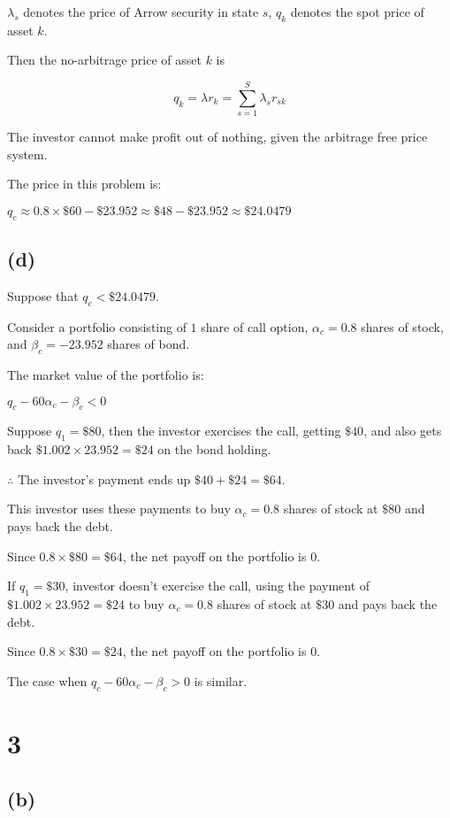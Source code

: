 \documentclass{article}
\begin{document}
$\lambda_{s}$ denotes the price of Arrow security in state $s$, $q_{k}$ denotes the spot price of asset $k$.

Then the no-arbitrage price of asset $k$ is 

\begin{equation*}
    q_{k}=\lambda r_{k}=\sum^{S}_{s=1}\lambda_{s}r_{sk}
\end{equation*}

The investor cannot make profit out of nothing, given the arbitrage free price system.

The price in this problem is:

$q_{c}\approx0.8\times\$60-\$23.952\approx\$48-\$23.952\approx\boxed{\$24.0479}$

\subsection*{(d)}

Suppose that $q_{c}<\$24.0479$.

Consider a portfolio consisting of $1$ share of call option, $\alpha_{c}=0.8$ shares of stock, and $\beta_{c}=-23.952$ shares of bond.

The market value of the portfolio is:

$q_{c}-60\alpha_{c}-\beta_{c}<0$

Suppose $q_{1}=\$80$, then the investor exercises the call, getting $\$40$, and also gets back $\$1.002\times23.952=\$24$ on the bond holding.

$\therefore$ The investor's payment ends up $\$40+\$24=\$64$.

This investor uses these payments to buy $\alpha_{c}=0.8$ shares of stock at $\$80$ and pays back the debt.

Since $0.8\times\$80=\$64$, the net payoff on the portfolio is $0$.

If $q_{1}=\$30$, investor doesn't exercise the call, using the payment of $\$1.002\times23.952=\$24$ to buy $\alpha_{c}=0.8$ shares of stock at $\$30$ and pays back the debt.

Since $0.8\times\$30=\$24$, the net payoff on the portfolio is $0$.

The case when $q_{c}-60\alpha_{c}-\beta_{c}>0$ is similar.

\section*{3}

\subsection*{(b)}
\end{document}
